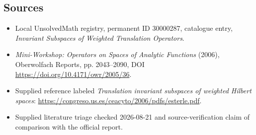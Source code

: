 \documentclass[11pt]{article}
\begin{document}
\subsection{Sources}
\begin{itemize}
\item Local UnsolvedMath registry, permanent ID 30000287, catalogue entry, \emph{Invariant Subspaces of Weighted Translation Operators}.
\item \emph{Mini-Workshop: Operators on Spaces of Analytic Functions} (2006), Oberwolfach Reports, pp. 2043--2090, DOI \url{https://doi.org/10.4171/owr/2005/36}.
\item Supplied reference labeled \emph{Translation invariant subspaces of weighted Hilbert spaces}: \url{https://congreso.us.es/ceacyto/2006/pdfs/esterle.pdf}.
\item Supplied literature triage checked 2026-08-21 and source-verification claim of comparison with the official report.
\end{itemize}
\end{document}
